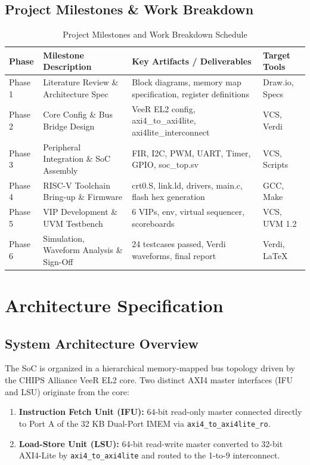 \documentclass[12pt,a4paper,oneside]{report}
\begin{document}
\section{Project Milestones \& Work Breakdown}
\begin{table}[htbp]
\centering
\caption{Project Milestones and Work Breakdown Schedule}
\small
\begin{tabularx}{\textwidth}{llXl}
\toprule
\textbf{Phase} & \textbf{Milestone Description} & \textbf{Key Artifacts / Deliverables} & \textbf{Target Tools} \\
\midrule
Phase 1 & Literature Review \& Architecture Spec & Block diagrams, memory map specification, register definitions & Draw.io, Specs \\
Phase 2 & Core Config \& Bus Bridge Design & VeeR EL2 config, axi4\_to\_axi4lite, axi4lite\_interconnect & VCS, Verdi \\
Phase 3 & Peripheral Integration \& SoC Assembly & FIR, I2C, PWM, UART, Timer, GPIO, soc\_top.sv & VCS, Scripts \\
Phase 4 & RISC-V Toolchain Bring-up \& Firmware & crt0.S, link.ld, drivers, main.c, flash hex generation & GCC, Make \\
Phase 5 & VIP Development \& UVM Testbench & 6 VIPs, env, virtual sequencer, scoreboards & VCS, UVM 1.2 \\
Phase 6 & Simulation, Waveform Analysis \& Sign-Off & 24 testcases passed, Verdi waveforms, final report & Verdi, LaTeX \\
\bottomrule
\end{tabularx}
\end{table}

\chapter{Architecture Specification}
\section{System Architecture Overview}
The SoC is organized in a hierarchical memory-mapped bus topology driven by the CHIPS Alliance VeeR EL2 core. Two distinct AXI4 master interfaces (IFU and LSU) originate from the core:
\begin{enumerate}
    \item \textbf{Instruction Fetch Unit (IFU):} 64-bit read-only master connected directly to Port A of the 32 KB Dual-Port IMEM via \texttt{axi4\_to\_axi4lite\_ro}.
    \item \textbf{Load-Store Unit (LSU):} 64-bit read-write master converted to 32-bit AXI4-Lite by \texttt{axi4\_to\_axi4lite} and routed to the 1-to-9 interconnect.
\end{enumerate}
\end{document}
